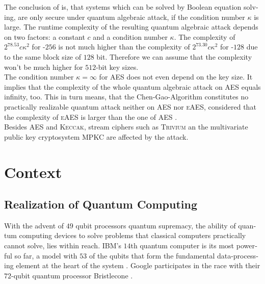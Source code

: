 \documentclass[a4paper,11pt]{article}
\begin{document}
\begin{otherlanguage}{english}
\noindent
The conclusion of \cite{QAA} is, that systems which can be solved by Boolean equation solving, are only secure under quantum algebraic attack, if the condition number $\kappa$ is large. The runtime complexity of the resulting quantum algebraic attack depends on two factors: a constant $c$ and a condition number $\kappa$. The complexity of $2^{78.53}c\kappa^2$ for -$256$ is not much higher than the complexity of $2^{73.30}c\kappa^2$ for -$128$ due to the same block size of $128$ bit. Therefore we can assume that the complexity won't be much higher for $512$-bit key sizes.\\

\noindent
The condition number $\kappa = \infty$ for \textsc{AES} does not even depend on the key size. It implies that the complexity of the whole quantum algebraic attack on \textsc{AES} equals infinity, too. 
This in turn means, that the Chen-Gao-Algorithm constitutes no practically realizable quantum attack neither on \textsc{AES} nor \textsc{eAES}, considered that the complexity of \textsc{eAES} is larger than 
the one of \textsc{AES} \cite{BUK}. \\

\noindent
Besides \textsc{AES} and \textsc{Keccak}, stream ciphers such as \textsc{Trivium} an the multivariate public key cryptosystem \textsc{MPKC} are affected by the attack. \\


\section{Context}

\subsection{Realization of Quantum Computing}

\noindent
With the advent of $49$ qubit processors quantum supremacy, the ability of quantum computing devices to solve problems that classical computers practically cannot solve,  lies within reach. IBM's $14$th quantum computer is its most powerful so far, a model with $53$ of the qubits that form the fundamental data-processing element at the heart of the system \cite{MSN}. Google participates in the race with their $72$-qubit quantum processor Bristlecone \cite{googleai}. \\


\end{otherlanguage}
\end{document}

